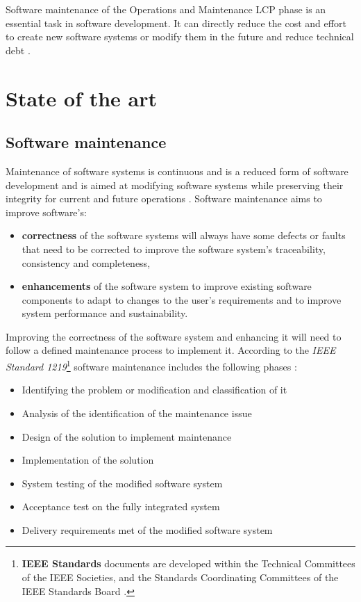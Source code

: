 Software maintenance of the Operations and Maintenance LCP phase is an essential task in software development. It can directly reduce the cost and effort to create new software systems or modify them in the future and reduce technical debt \cite{Thamburaj2017, DeLeon-Sigg2020}. 

\clearpage

\section{State of the art}

\subsection{Software maintenance}\label{sec:ch1_softwareMaintenanceIntro}{}
Maintenance of software systems is continuous and is a reduced form of software development and is aimed at modifying software systems while preserving their integrity for current and future operations \cite{Sneed2004, Ackermann2009, Port2017}. Software maintenance aims to improve software's:

\begin{itemize}
	\item \textbf{correctness} of the software systems will always have some defects or faults that need to be corrected to improve the software system's traceability, consistency and completeness,
	\item \textbf{enhancements} of the software system to improve existing software components to adapt to changes to the user's requirements and to improve system performance and sustainability. 
\end{itemize}

Improving the correctness of the software system and enhancing it will need to follow a defined maintenance process to implement it. According to the \textit{IEEE Standard 1219}\footnote{\textbf{IEEE Standards} documents are developed within the Technical Committees of the IEEE Societies, and the Standards Coordinating Committees of the IEEE Standards Board \cite{Mamone1994}.} software maintenance includes the following phases \cite{Mamone1994, Hasan2012}:
\begin{itemize}
	\item Identifying the problem or modification and classification of it
	\item Analysis of the identification of the maintenance issue
	\item Design of the solution to implement maintenance
	\item Implementation of the solution
	\item System testing of the modified software system
	\item Acceptance test on the fully integrated system
	\item Delivery requirements met of the modified software system
\end{itemize}

